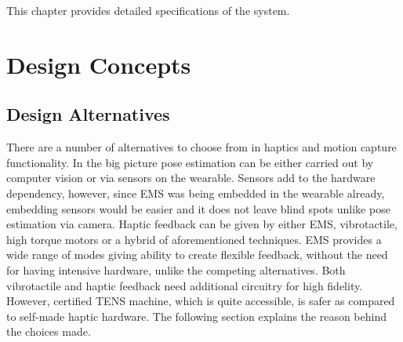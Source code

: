 This chapter provides detailed specifications of the system.




\section{Design Concepts}

\subsection{Design Alternatives}

There are a number of alternatives to choose from in haptics and motion capture functionality. In the big picture pose estimation can be either carried out by computer vision or via sensors on the wearable. Sensors add to the hardware dependency, however, since EMS was being embedded in the wearable already, embedding sensors would be easier and it does not leave blind spots unlike pose estimation via camera. Haptic feedback can be given by either EMS, vibrotactile, high torque motors or a hybrid of aforementioned techniques. EMS provides a wide range of modes giving ability to create flexible feedback, without the need for having intensive hardware, unlike the competing alternatives. Both vibrotactile and haptic feedback need additional circuitry for high fidelity. However, certified TENS machine, which is quite accessible, is safer as compared to self-made haptic hardware. The following section explains the reason behind the choices made. 

